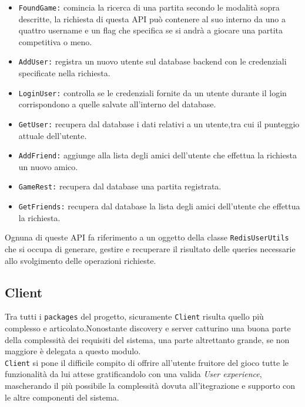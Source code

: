  \begin{itemize}
   \item{\texttt{FoundGame:\/}} comincia la ricerca di una partita secondo le modalità sopra descritte, la richiesta di questa API può contenere al suo interno da uno a quattro username e un flag che specifica se si andrà a giocare una partita competitiva o meno.

   \item{\texttt{AddUser:\/}} registra un nuovo utente sul database backend con le credenziali specificate nella richiesta.

   \item{\texttt{LoginUser:\/}} controlla se le credenziali fornite da un utente durante il login corrispondono a quelle salvate all'interno del database.

   \item{\texttt{GetUser:\/}} recupera dal database i dati relativi a un utente,tra cui il punteggio attuale dell'utente.

   \item{\texttt{AddFriend:\/}} aggiunge alla lista degli amici dell'utente che effettua la richiesta un nuovo amico.

    \item{\texttt{GameRest:\/}} recupera dal database una partita registrata.

    \item{\texttt{GetFriends:\/}} recupera dal database la lista degli amici dell'utente che effettua la richiesta.
 \end{itemize}

 Ognuna di queste API fa riferimento a un oggetto della classe \texttt{RedisUserUtils} che si occupa di generare, gestire e recuperare il risultato delle queries necessarie allo svolgimento delle operazioni richieste.

  \subsection {Client}\label{subsec:details:client}
  Tra tutti i \texttt{packages} del progetto, sicuramente \texttt{Client} risulta quello più complesso e articolato.Nonostante discovery e server catturino una buona parte della complessità dei requisiti del sistema, una parte altrettanto grande, se non maggiore è delegata a questo modulo.\\
  \texttt{Client} si pone il difficile compito di offrire all'utente fruitore del gioco tutte le funzionalità da lui attese gratificandolo con una valida \textit{User experience}, mascherando il più possibile la complessità dovuta all'itegrazione e supporto con le altre componenti del sistema.

